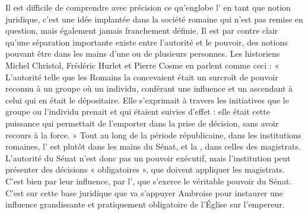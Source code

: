 Il est difficile de comprendre avec précision ce qu’englobe l’ en tant que notion juridique, c’est une idée implantée dans la société romaine qui n’est pas remise en question, mais également jamais franchement définie. Il est par contre clair qu’une séparation importante existe entre l’autorité et le pouvoir, des notions pouvant être dans les mains d’une ou de plusieurs personnes. Les historiens Michel Christol, Frédéric Hurlet et Pierre Cosme en parlent comme ceci : « L’autorité telle que les Romains la concevaient était un surcroît de pouvoir reconnu à un groupe où un individu, conférant une influence et un ascendant à celui qui en était le dépositaire. Elle s’exprimait à travers les initiatives que le groupe ou l’individu prenait et qui étaient suivies d’effet : elle était cette puissance qui permettait de l’emporter dans la prise de décision, sans avoir recours à la force. »\autocite{christol_histoire_2021} Tout au long de la période républicaine, dans les institutions romaines, l’ est plutôt dans les mains du Sénat, et la , dans celles des magistrats. L’autorité du Sénat n’est donc pas un pouvoir exécutif, mais l’institution peut présenter des décisions « obligatoires », que doivent appliquer les magistrats. C’est bien par leur influence, par l’, que s’exerce le véritable pouvoir du Sénat. C’est sur cette base juridique que va s’appuyer Ambroise pour instaurer une influence grandissante et pratiquement obligatoire de l’Église sur l’empereur.

\bigskip

